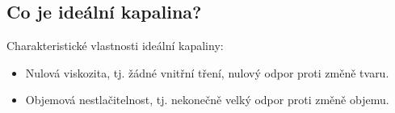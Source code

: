 
\subsection{Co je ideální kapalina?}
Charakteristické vlastnosti ideální kapaliny:
\begin{itemize}
	\item Nulová viskozita, tj. žádné vnitřní tření, nulový odpor proti změně tvaru.
	\item Objemová nestlačitelnost, tj. nekonečně velký odpor proti změně objemu.
\end{itemize}
